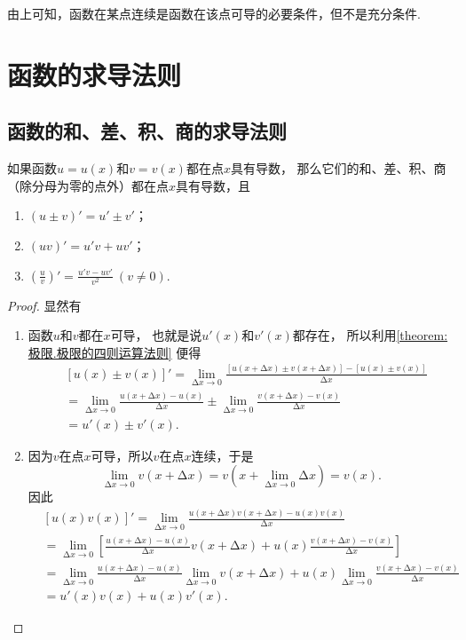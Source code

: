 由上可知，函数在某点连续是函数在该点可导的必要条件，但不是充分条件.

\section{函数的求导法则}
\subsection{函数的和、差、积、商的求导法则}
\begin{theorem}
如果函数\(u=u(x)\)和\(v=v(x)\)都在点\(x\)具有导数，
那么它们的和、差、积、商（除分母为零的点外）都在点\(x\)具有导数，且
\begin{enumerate}[label={\rm\arabic*.}]
	\item \((u \pm v)' = u' \pm v'\)；
	\item \((uv)' = u'v + uv'\)；
	\item \(\left(\frac{u}{v}\right)' = \frac{u'v - uv'}{v^2}\ (v \neq 0)\).
\end{enumerate}
\begin{proof}
显然有
\begin{enumerate}
\item 函数\(u\)和\(v\)都在\(x\)可导，
也就是说\(u'(x)\)和\(v'(x)\)都存在，
所以利用\cref{theorem:极限.极限的四则运算法则} 便得
\begin{align*}
&[u(x) \pm v(x)]'
=\lim\limits_{\increment x\to0} \frac{[u(x+\increment x) \pm v(x+\increment x)]-[u(x) \pm v(x)]}{\increment x} \\
&=\lim\limits_{\increment x\to0} \frac{u(x+\increment x)-u(x)}{\increment x} \pm \lim\limits_{\increment x\to0} \frac{v(x+\increment x)-v(x)}{\increment x} \\
&=u'(x) \pm v'(x).
\end{align*}

\item 因为\(v\)在点\(x\)可导，所以\(v\)在点\(x\)连续，于是\[
	\lim_{\increment x\to0} v(x+\increment x)
	= v\left(x+\lim_{\increment x\to0} \increment x\right)
	= v(x).
\]
因此
\begin{align*}
&[u(x) v(x)]'
=\lim\limits_{\increment x\to0} \frac{u(x+\increment x) v(x+\increment x) - u(x) v(x)}{\increment x} \\
&=\lim\limits_{\increment x\to0} \left[
 \frac{u(x+\increment x) - u(x)}{\increment x} v(x+\increment x) + u(x) \frac{v(x+\increment x) - v(x)}{\increment x}
 \right] \\
&=\lim\limits_{\increment x\to0} \frac{u(x+\increment x) - u(x)}{\increment x} %
 \lim\limits_{\increment x\to0} v(x+\increment x) %
 + u(x) \lim\limits_{\increment x\to0} \frac{v(x+\increment x)-v(x)}{\increment x} \\
&=u'(x) v(x) + u(x) v'(x).
\end{align*}


\end{enumerate}
\end{proof}
\end{theorem}
